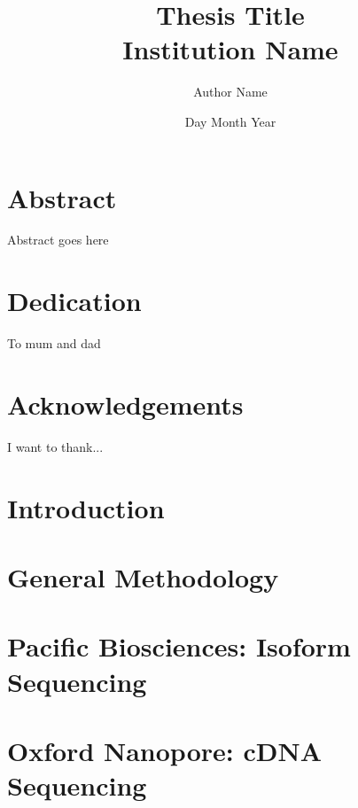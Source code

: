 \documentclass[a4paper,12pt,oneside]{report}
\begin{document}
\title{
	{Thesis Title}\\
	{\large Institution Name}\\}
\author{Author Name}
\date{Day Month Year}

\normallinespacing
\maketitle

\chapter*{Abstract}
Abstract goes here

\chapter*{Dedication}
To mum and dad

\chapter*{Acknowledgements}
I want to thank...

\newpage
\tableofcontents

\newpage
\listoffigures

\newpage
\listoftables

\newpage
\renewcommand{\nomname}{Abbreviations}
\printnomenclature 

\chapter{Introduction}


\chapter{General Methodology}


\chapter{Pacific Biosciences: Isoform Sequencing}




\chapter{Oxford Nanopore: cDNA Sequencing}


\end{document}
